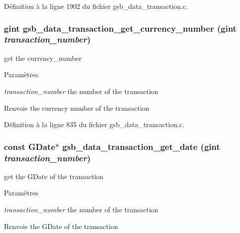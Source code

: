 Définition à la ligne 1902 du fichier gsb\_\-data\_\-transaction.c.

\subsubsection[{gsb\_\-data\_\-transaction\_\-get\_\-currency\_\-number}]{\setlength{\rightskip}{0pt plus 5cm}gint gsb\_\-data\_\-transaction\_\-get\_\-currency\_\-number (gint {\em transaction\_\-number})}\label{gsb__data__transaction_8c_aa39edcb597bd75a438b00b67cf898e88}
get the currency\_\-number 
\begin{DoxyParams}{Paramètres}
\item[{\em transaction\_\-number}]the number of the transaction \end{DoxyParams}
\begin{DoxyReturn}{Renvoie}
the currency number of the transaction 
\end{DoxyReturn}


Définition à la ligne 835 du fichier gsb\_\-data\_\-transaction.c.

\subsubsection[{gsb\_\-data\_\-transaction\_\-get\_\-date}]{\setlength{\rightskip}{0pt plus 5cm}const GDate$\ast$ gsb\_\-data\_\-transaction\_\-get\_\-date (gint {\em transaction\_\-number})}\label{gsb__data__transaction_8c_ab0b62014885bcf3e2fbfff1ae9b32080}
get the GDate of the transaction


\begin{DoxyParams}{Paramètres}
\item[{\em transaction\_\-number}]the number of the transaction\end{DoxyParams}
\begin{DoxyReturn}{Renvoie}
the GDate of the transaction 
\end{DoxyReturn}


